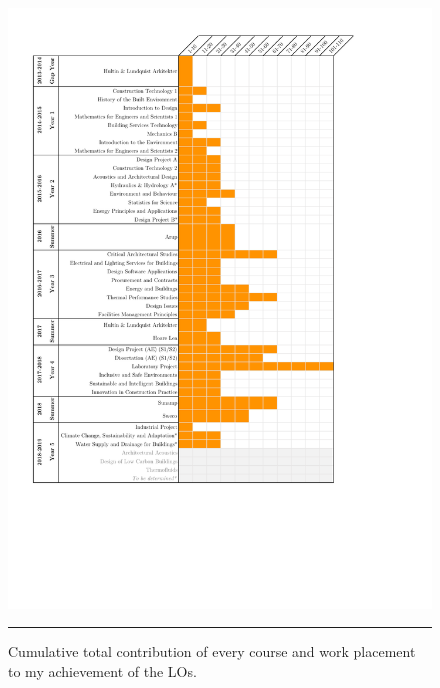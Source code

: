 \begin{figure}[htbp]
	\centering
	\includegraphics[height=\textheight]{Appendices/Cumulative_Courses_Orange_Small.pdf}
	\rule{\textwidth}{0.5pt} %
	\caption{Cumulative total contribution of every course and work placement to my achievement of the LOs.}
	\label{fig:cum_courses}
\end{figure}